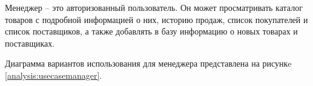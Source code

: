 \begin{figure}[H]
\end{figure}

\pagebreak

Менеджер – это авторизованный пользователь. Он может просматривать каталог товаров с подробной информацией о них, историю продаж, список покупателей и список поставщиков, а также добавлять в базу информацию о новых товарах и поставщиках.

Диаграмма вариантов использования для менеджера представлена на рисункe \ref{analysis:usecasemanager}.

\begin{figure}[H]
\end{figure}

